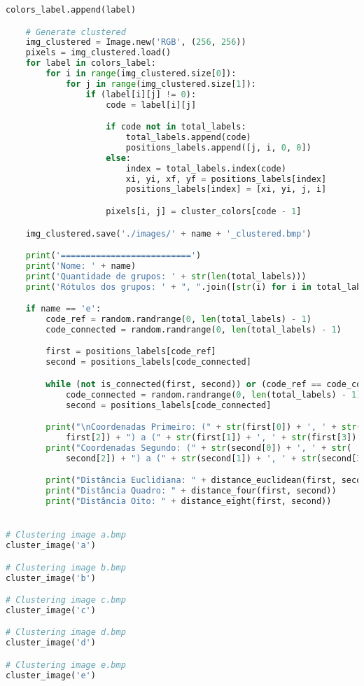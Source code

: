 \documentclass{article}
\begin{document}
\begin{lstlisting}[language=Python]
        colors_label.append(label)

    # Generate clustered
    img_clustered = Image.new('RGB', (256, 256))
    pixels = img_clustered.load()
    for label in colors_label:
        for i in range(img_clustered.size[0]):
            for j in range(img_clustered.size[1]):
                if (label[i][j] != 0):
                    code = label[i][j]

                    if code not in total_labels:
                        total_labels.append(code)
                        positions_labels.append([j, i, 0, 0])
                    else:
                        index = total_labels.index(code)
                        xi, yi, xf, yf = positions_labels[index]
                        positions_labels[index] = [xi, yi, j, i]

                    pixels[i, j] = cluster_colors[code - 1]

    img_clustered.save('./images/' + name + '_clustered.bmp')

    print('==========================')
    print('Nome: ' + name)
    print('Quantidade de grupos: ' + str(len(total_labels)))
    print('Rótulos dos grupos: ' + ", ".join([str(i) for i in total_labels]))

    if name == 'e':
        code_ref = random.randrange(0, len(total_labels) - 1)
        code_connected = random.randrange(0, len(total_labels) - 1)

        first = positions_labels[code_ref]
        second = positions_labels[code_connected]

        while (not is_connected(first, second)) or (code_ref == code_connected):
            code_connected = random.randrange(0, len(total_labels) - 1)
            second = positions_labels[code_connected]

        print("\nCoordenadas Primeiro: (" + str(first[0]) + ', ' + str(
            first[2]) + ") a (" + str(first[1]) + ', ' + str(first[3]) + ")")
        print("Coordenadas Segundo: (" + str(second[0]) + ', ' + str(
            second[2]) + ") a (" + str(second[1]) + ', ' + str(second[3]) + ")")

        print("Distância Euclidiana: " + distance_euclidean(first, second))
        print("Distância Quadro: " + distance_four(first, second))
        print("Distância Oito: " + distance_eight(first, second))


# Clustering image a.bmp
cluster_image('a')

# Clustering image b.bmp
cluster_image('b')

# Clustering image c.bmp
cluster_image('c')

# Clustering image d.bmp
cluster_image('d')

# Clustering image e.bmp
cluster_image('e')
\end{lstlisting}
\end{document}
